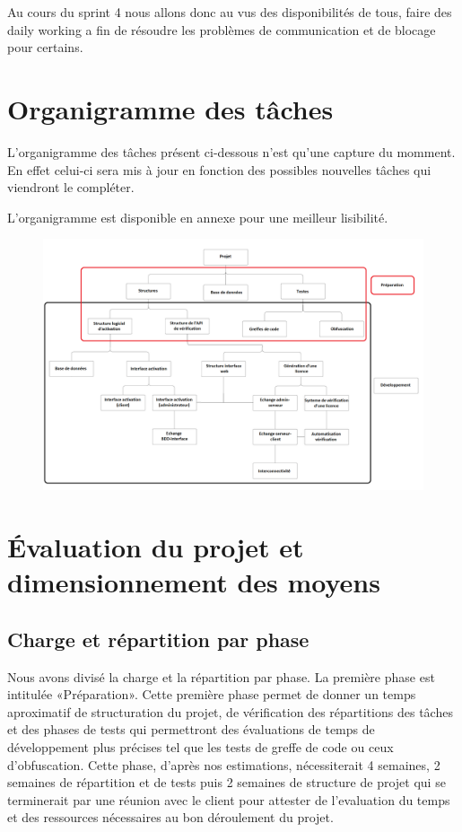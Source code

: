 Au cours du sprint 4 nous allons donc au vus des disponibilités de tous, 
faire des daily working a fin de résoudre les problèmes de communication 
et de blocage pour certains.

\chapter{Organigramme des tâches}
L'organigramme des tâches présent ci-dessous n'est qu'une capture du momment. En effet celui-ci sera mis à jour en fonction 
des possibles nouvelles tâches qui viendront le compléter.\newline

L'organigramme est disponible en annexe pour une meilleur lisibilité.\newline

\begin{figure}[!h]
    \centering
    \includegraphics[width=18cm]{organi.png}
\end{figure}

\chapter{Évaluation du projet et dimensionnement des moyens}

\section{Charge et répartition par phase}
Nous avons divisé la charge et la répartition par phase. La première phase est intitulée
«Préparation». Cette première phase permet de donner un temps aproximatif de structuration du
projet, de vérification des répartitions des tâches et des phases de tests qui permettront des
évaluations de temps de développement plus précises tel que les tests de greffe de code ou ceux
d'obfuscation. Cette phase, d'après nos estimations, nécessiterait 4 semaines, 2 semaines de
répartition et de tests puis 2 semaines de structure de projet qui se terminerait par une
réunion avec le client pour attester de l'evaluation du temps
et des ressources nécessaires au bon déroulement du projet.\newline
\newline

